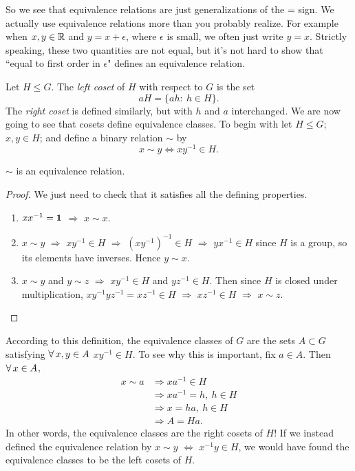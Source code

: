 So we see that equivalence relations are just generalizations of the =
sign. We actually use equivalence relations more than you probably realize.
For example when $x,y\in\mathbb{R}$ and $y=x+\epsilon$, where $\epsilon$ is
small, we often just write $y=x$. Strictly speaking, these two quantities
are not equal, but it's not hard to show that ``equal to first order in
$\epsilon$" defines an equivalence relation.

Let $H\le G$. The {\it left coset}  of $H$ with respect to 
$G$ is the set
  $$ aH=\{ah:\ h\in H\}. $$
The {\it right coset} is defined similarly, but with $h$ and $a$
interchanged.
We are now going to see that cosets define equivalence classes. To begin with
let $H\le G$; $x,y\in H$; and define a binary relation $\sim$ by
\begin{equation}
  x\sim y \Leftrightarrow xy^{-1}\in H.
\end{equation}
\begin{proposition}{}{}
  $\sim$ is an equivalence relation.
  \begin{proof}
    We just need to check that it satisfies all the defining properties.
    \begin{enumerate}
      \item $xx^{-1}={\mathbf 1}$ $\Rightarrow$ $x\sim x$.
      \item $x\sim y$ $\Rightarrow$ $xy^{-1}\in H$ $\Rightarrow$
            $(xy^{-1})^{-1}\in H$ $\Rightarrow$ $yx^{-1}\in H$
            since $H$ is a group, so its elements have inverses.
            Hence $y\sim x$.
      \item $x\sim y$ and $y\sim z$ $\Rightarrow$ $xy^{-1}\in H$ and
            $yz^{-1}\in H$. Then since $H$ is closed under multiplication,
            $xy^{-1}yz^{-1}=xz^{-1}\in H$ $\Rightarrow$ $xz^{-1}\in H$ 
            $\Rightarrow$ $x\sim z$.
    \end{enumerate}
  \end{proof}
\end{proposition}
According to this definition, the equivalence classes of $G$ are the sets
$A\subset G$ satisfying $\operatorname{\forall} x,y\in A$ $xy^{-1}\in H$. To see why this is
important, fix $a\in A$. Then $\operatorname{\forall} x\in A$,
\begin{equation}
  \begin{aligned}
    x\sim a &\Rightarrow xa^{-1}\in H \\
            &\Rightarrow xa^{-1}=h,\ h\in H\\
            &\Rightarrow x=ha,\ h\in H\\
            &\Rightarrow A=Ha.
  \end{aligned}
\end{equation}
In other words, the equivalence classes are the right cosets of $H$! If we
instead defined the equivalence relation by $x\sim y$ $\Leftrightarrow$
$x^{-1}y\in H$, we would have found the equivalence classes to be the left
cosets of $H$.


